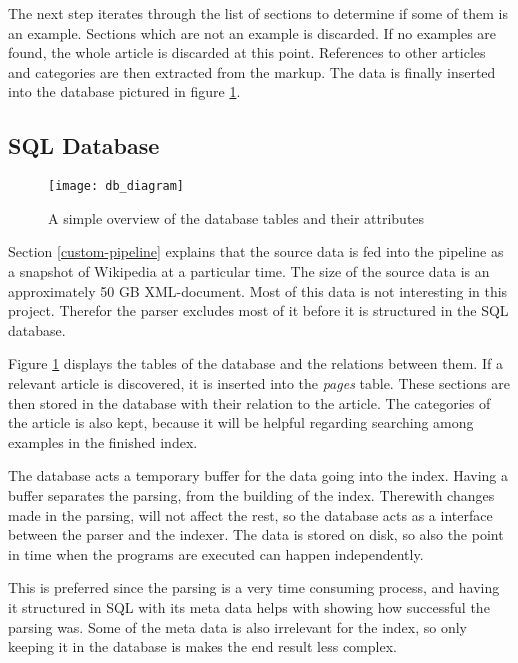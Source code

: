 The next step iterates through the list of sections to determine if some of them is an example. Sections which are not an example is discarded. If no examples are found, the whole article is discarded at this point. References to other articles and categories are then extracted from the markup. The data is finally inserted into the database pictured in figure \ref{fig:db_diagram}.



\subsection{SQL Database}

\begin{figure}[h] 
\caption{A simple overview of the database tables and their attributes}
\texttt{[image: db\_diagram]}
\label{fig:db_diagram}
\end{figure}


Section \ref{custom-pipeline} explains that the source data is fed into the pipeline as a snapshot of Wikipedia at a particular time. The size of the source data is an approximately 50 GB XML-document. Most of this data is not interesting in this project. Therefor the parser excludes most of it before it is structured in the SQL database. 

Figure \ref{fig:db_diagram} displays the tables of the database and the relations between them. If a relevant article is discovered, it is inserted into the \textit{pages} table. These sections are then stored in the database with their relation to the article. The categories of the article is also kept, because it will be helpful regarding searching among examples in the finished index.  

The database acts a temporary buffer for the data going into the index. Having a buffer separates the parsing, from the building of the index. Therewith changes made in the parsing, will not affect the rest, so the database acts as a interface between the parser and the indexer. The data is stored on disk, so also the point in time when the programs are executed can happen independently.

This is preferred since the parsing is a very time consuming process, and having it structured in SQL with its meta data helps with showing how successful the parsing was. Some of the meta data is also irrelevant for the index, so only keeping it in the database is makes the end result less complex.


